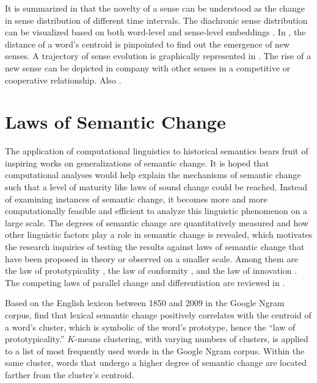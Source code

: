 It is summarized in \textcite{tang2018state} that the novelty of a sense can be understood as the change in sense distribution of different time intervals. The diachronic sense distribution can be visualized based on both word-level and sense-level embeddings \parencite{dubossarsky2015bottom,hu2019diachronic}. In \textcite{dubossarsky2015bottom}, the distance of a word's centroid is pinpointed to find out the emergence of new senses. A trajectory of sense evolution is graphically represented in \textcite{hu2019diachronic}. The rise of a new sense can be depicted in company with other senses in a competitive or cooperative relationship. Also \parencite{gonen2020simple}.

\section{Laws of Semantic Change}
The application of computational linguistics to historical semantics bears fruit of inspiring works on generalizations of semantic change. It is hoped that computational analyses would help explain the mechanisms of semantic change such that a level of maturity like laws of sound change could be reached. Instead of examining instances of semantic change, it becomes more and more computationally feasible and efficient to analyze this linguistic phenomenon on a large scale. The degrees of semantic change are quantitatively measured and how other linguistic factors play a role in semantic change is revealed, which motivates the research inquiries of testing the results against laws of semantic change that have been proposed in theory or observed on a smaller scale. Among them are the law of prototypicality \parencite{dubossarsky2015bottom}, the law of conformity \parencite{hamilton2016law}, and the law of innovation \parencite{hamilton2016law}. The competing laws of parallel change and differentiation are reviewed in \textcite{xu2015computational}.

Based on the English lexicon between 1850 and 2009 in the Google Ngram corpus, \textcite{dubossarsky2015bottom} find that lexical semantic change positively correlates with the centroid of a word's cluster, which is symbolic of the word's prototype, hence the ``law of prototypicality.'' $K$-means clustering, with varying numbers of clusters, is applied to a list of most frequently used words in the Google Ngram corpus. Within the same cluster, words that undergo a higher degree of semantic change are located farther from the cluster's centroid.


